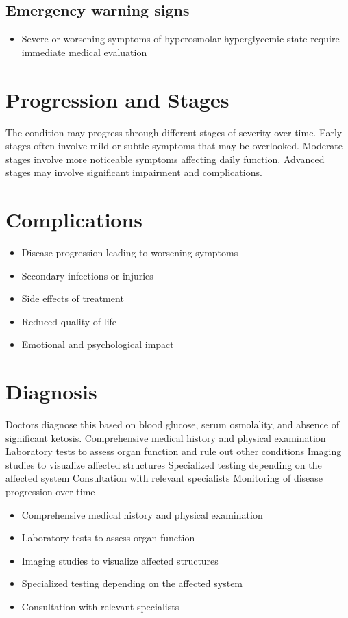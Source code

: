 \subsection{Emergency warning signs}
\begin{itemize}[noitemsep]
  \item Severe or worsening symptoms of hyperosmolar hyperglycemic state require immediate medical evaluation
\end{itemize}
\section{Progression and Stages}
The condition may progress through different stages of severity over time. Early stages often involve mild or subtle symptoms that may be overlooked. Moderate stages involve more noticeable symptoms affecting daily function. Advanced stages may involve significant impairment and complications.
\section{Complications}
\begin{itemize}[noitemsep]
  \item Disease progression leading to worsening symptoms
  \item Secondary infections or injuries
  \item Side effects of treatment
  \item Reduced quality of life
  \item Emotional and psychological impact
\end{itemize}
\section{Diagnosis}
Doctors diagnose this based on blood glucose, serum osmolality, and absence of significant ketosis. Comprehensive medical history and physical examination Laboratory tests to assess organ function and rule out other conditions Imaging studies to visualize affected structures Specialized testing depending on the affected system Consultation with relevant specialists Monitoring of disease progression over time

\begin{itemize}[noitemsep]
  \item Comprehensive medical history and physical examination
  \item Laboratory tests to assess organ function
  \item Imaging studies to visualize affected structures
  \item Specialized testing depending on the affected system
  \item Consultation with relevant specialists
\end{itemize}
